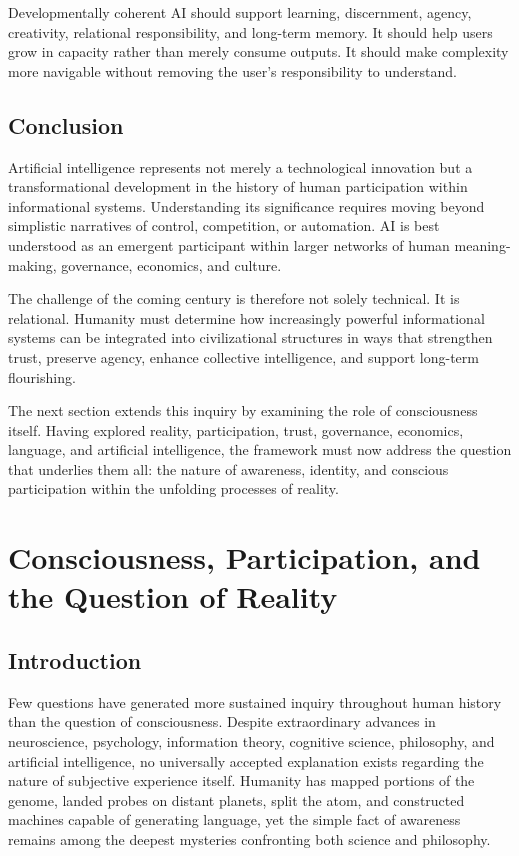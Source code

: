 \documentclass[12pt]{article}
\begin{document}
Developmentally coherent AI should support learning, discernment, agency, creativity, relational responsibility, and long-term memory. It should help users grow in capacity rather than merely consume outputs. It should make complexity more navigable without removing the user's responsibility to understand.

\subsection{Conclusion}

Artificial intelligence represents not merely a technological innovation but a transformational development in the history of human participation within informational systems. Understanding its significance requires moving beyond simplistic narratives of control, competition, or automation. AI is best understood as an emergent participant within larger networks of human meaning-making, governance, economics, and culture.

The challenge of the coming century is therefore not solely technical. It is relational. Humanity must determine how increasingly powerful informational systems can be integrated into civilizational structures in ways that strengthen trust, preserve agency, enhance collective intelligence, and support long-term flourishing.

The next section extends this inquiry by examining the role of consciousness itself. Having explored reality, participation, trust, governance, economics, language, and artificial intelligence, the framework must now address the question that underlies them all: the nature of awareness, identity, and conscious participation within the unfolding processes of reality.

\section{Consciousness, Participation, and the Question of Reality}

\subsection{Introduction}

Few questions have generated more sustained inquiry throughout human history than the question of consciousness. Despite extraordinary advances in neuroscience, psychology, information theory, cognitive science, philosophy, and artificial intelligence, no universally accepted explanation exists regarding the nature of subjective experience itself. Humanity has mapped portions of the genome, landed probes on distant planets, split the atom, and constructed machines capable of generating language, yet the simple fact of awareness remains among the deepest mysteries confronting both science and philosophy.
\end{document}
